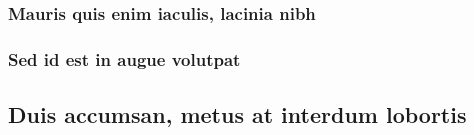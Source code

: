 \documentclass[%
  german,%
  exercise,%
  oneside,%
]{iswartcl}
\begin{document}
\lipsum[1-8]

\subsubsection{Mauris quis enim iaculis, lacinia nibh}

\lipsum[1-8]

\subsubsection{Sed id est in augue volutpat}

\lipsum[1-8]

\subsection{Duis accumsan, metus at interdum lobortis}

\lipsum[1-8]
\end{document}
